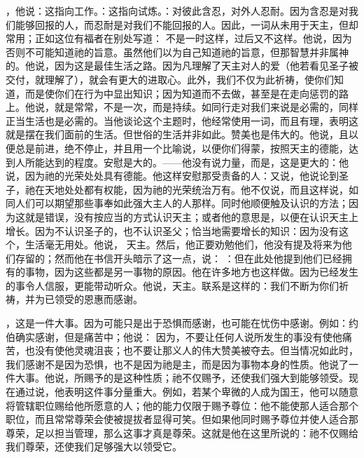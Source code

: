 ，他说：这指向工作。：这指向试炼。：对彼此含忍，对外人忍耐。因为含忍是对我们能够回报的人，而忍耐是对我们不能回报的人。因此，一词从未用于天主，但却常用；正如这位有福者在别处写道： 不是一时这样，过后又不这样。他说，因为否则不可能知道祂的旨意。虽然他们以为自己知道祂的旨意，但那智慧并非属神的。他说，因为这是最佳生活之路。因为凡理解了天主对人的爱（他若看见圣子被交付，就理解了），就会有更大的进取心。此外，我们不仅为此祈祷，使你们知道，而是使你们在行为中显出知识；因为知道而不去做，甚至是在走向惩罚的路上。他说，就是常常，不是一次，而是持续。如同行走对我们来说是必需的，同样正当生活也是必需的。当他谈论这个主题时，他经常使用一词，而且有理，表明这就是摆在我们面前的生活。但世俗的生活并非如此。赞美也是伟大的。他说，且以便总是前进，绝不停止，并且用一个比喻说，以便你们得蒙，按照天主的德能，达到人所能达到的程度。安慰是大的。——他没有说力量，而是，这是更大的：他说，因为祂的光荣处处具有德能。他这样安慰那受责备的人：又说，他说论到圣子，祂在天地处处都有权能，因为祂的光荣统治万有。他不仅说，而且这样说，如同人们可以期望那些事奉如此强大主人的人那样。同时他顺便触及认识的方法；因为这就是错误，没有按应当的方式认识天主；或者他的意思是，以便在认识天主上增长。因为不认识圣子的，也不认识圣父；恰当地需要增长的知识：因为没有这个，生活毫无用处。他说，  天主。然后，他正要劝勉他们，他没有提及将来为他们存留的；然而他在书信开头暗示了这一点，说： ：但在此处他提到他们已经拥有的事物，因为这些都是另一事物的原因。他在许多地方也这样做。因为已经发生的事令人信服，更能带动听众。他说，天主。联系是这样的：我们不断为你们祈祷，并为已领受的恩惠而感谢。\par

，这是一件大事。因为可能只是出于恐惧而感谢，也可能在忧伤中感谢。例如：约伯确实感谢，但是痛苦中；他说：  因为，不要让任何人说所发生的事没有使他痛苦，也没有使他灵魂沮丧；也不要让那义人的伟大赞美被夺去。但当情况如此时，我们感谢不是因为恐惧，也不是因为祂是主，而是因为事物本身的性质。他说了一件大事。他说，所赐予的是这种性质；祂不仅赐予，还使我们强大到能够领受。现在通过说，他表明这件事分量重大。例如，若某个卑微的人成为国王，他可以随意将管辖职位赐给他所愿意的人；他的能力仅限于赐予尊位：他不能使那人适合那个职位，而且常常尊荣会使被提拔者显得可笑。但如果他同时赐予尊位并使人适合那尊荣，足以担当管理，那么这事才真是尊荣。这就是他在这里所说的：祂不仅赐给我们尊荣，还使我们足够强大以领受它。\par


